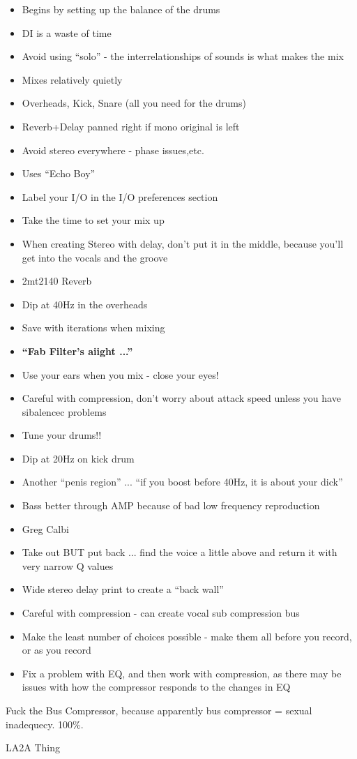 \documentclass{article}
\begin{document}
\begin{itemize}
\item Begins by setting up the balance of the drums
\item DI is a waste of time
\item Avoid using ``solo'' - the interrelationships of sounds is what makes the mix
\item Mixes relatively quietly 
\item Overheads, Kick, Snare (all you need for the drums)
\item Reverb+Delay panned right if mono original is left 
\item Avoid stereo everywhere - phase issues,etc.
\item Uses ``Echo Boy''
\item Label your I/O in the I/O preferences section 
\item Take the time to set your mix up
\item When creating Stereo with delay, don't put it in the middle, because you'll get into the vocals and the groove
\item 2mt2140 Reverb
\item Dip at 40Hz in the overheads 
\item Save with iterations when mixing
\item \textbf{``Fab Filter's aiight ...''}
\item Use your ears when you mix - close your eyes!
\item Careful with compression, don't worry about attack speed unless you have sibalencec problems
\item Tune your drums!!
\item Dip at 20Hz on kick drum 
\item Another ``penis region'' ... ``if you boost before 40Hz, it is about your dick''
\item Bass better through AMP because of bad low frequency reproduction
\item Greg Calbi
\item Take out BUT put back ... find the voice a little above and return it with very narrow Q values
\item Wide stereo delay print to create a ``back wall''
\item Careful with compression - can create vocal sub compression bus
\item Make the least number of choices possible - make them all before you record, or as you record
\item Fix a problem with EQ, and then work with compression, as there may be issues with how the compressor responds to the changes in EQ
\end{itemize}

\medskip

Fuck the Bus Compressor, because apparently bus compressor = sexual inadequecy. 100\%.

\medskip

LA2A Thing
\end{document}
